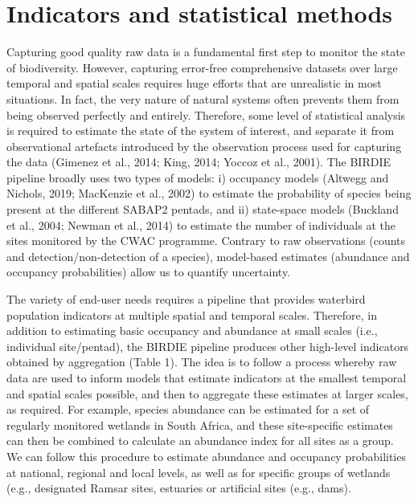 \documentclass[utf8]{frontiersSCNS}
\begin{document}
\hypertarget{indicators-and-statistical-methods}{%
\section*{Indicators and statistical
methods}\label{indicators-and-statistical-methods}}

Capturing good quality raw data is a fundamental first step to monitor
the state of biodiversity. However, capturing error-free comprehensive
datasets over large temporal and spatial scales requires huge efforts
that are unrealistic in most situations. In fact, the very nature of
natural systems often prevents them from being observed perfectly and
entirely. Therefore, some level of statistical analysis is required to
estimate the state of the system of interest, and separate it from
observational artefacts introduced by the observation process used for
capturing the data (Gimenez et al., 2014; King, 2014; Yoccoz et al.,
2001). The BIRDIE pipeline broadly uses two types of models: i)
occupancy models (Altwegg and Nichols, 2019; MacKenzie et al., 2002) to
estimate the probability of species being present at the different
SABAP2 pentads, and ii) state-space models (Buckland et al., 2004;
Newman et al., 2014) to estimate the number of individuals at the sites
monitored by the CWAC programme. Contrary to raw observations (counts
and detection/non-detection of a species), model-based estimates
(abundance and occupancy probabilities) allow us to quantify
uncertainty.

The variety of end-user needs requires a pipeline that provides
waterbird population indicators at multiple spatial and temporal scales.
Therefore, in addition to estimating basic occupancy and abundance at
small scales (i.e., individual site/pentad), the BIRDIE pipeline
produces other high-level indicators obtained by aggregation (Table 1).
The idea is to follow a process whereby raw data are used to inform
models that estimate indicators at the smallest temporal and spatial
scales possible, and then to aggregate these estimates at larger scales,
as required. For example, species abundance can be estimated for a set
of regularly monitored wetlands in South Africa, and these site-specific
estimates can then be combined to calculate an abundance index for all
sites as a group. We can follow this procedure to estimate abundance and
occupancy probabilities at national, regional and local levels, as well
as for specific groups of wetlands (e.g., designated Ramsar sites,
estuaries or artificial sites (e.g., dams).
\end{document}

